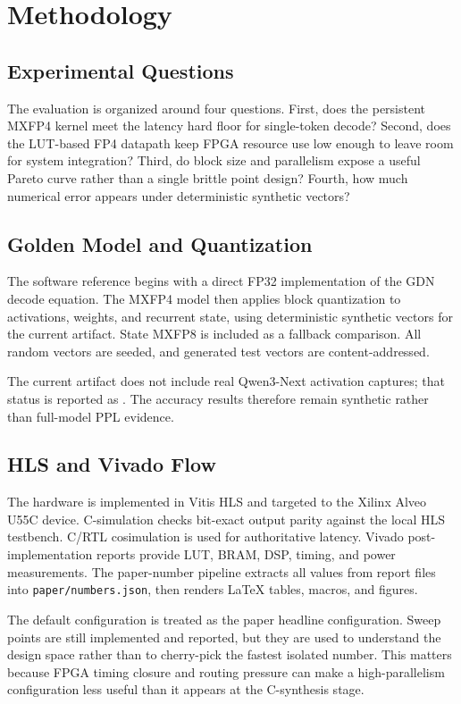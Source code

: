 \documentclass[conference]{IEEEtran}
\begin{document}
\section{Methodology}

\subsection{Experimental Questions}

The evaluation is organized around four questions. First, does the persistent
MXFP4 kernel meet the latency hard floor for single-token decode? Second, does
the LUT-based FP4 datapath keep FPGA resource use low enough to leave room for
system integration? Third, do block size and parallelism expose a useful Pareto
curve rather than a single brittle point design? Fourth, how much numerical error
appears under deterministic synthetic vectors?

\subsection{Golden Model and Quantization}

The software reference begins with a direct FP32 implementation of the GDN decode
equation. The MXFP4 model then applies block quantization to activations,
weights, and recurrent state, using deterministic synthetic vectors for the
current artifact. State MXFP8 is included as a fallback comparison. All random
vectors are seeded, and generated test vectors are content-addressed.

The current artifact does not include real Qwen3-Next activation captures; that
status is reported as \QwenCaptureStatus. The accuracy results therefore remain
synthetic rather than full-model PPL evidence.

\subsection{HLS and Vivado Flow}

The hardware is implemented in Vitis HLS and targeted to the Xilinx Alveo U55C
device. C-simulation checks bit-exact output parity against the local HLS
testbench. C/RTL cosimulation is used for authoritative latency. Vivado
post-implementation reports provide LUT, BRAM, DSP, timing, and power
measurements. The paper-number pipeline extracts all values from report files
into \texttt{paper/numbers.json}, then renders LaTeX tables, macros, and figures.

The default configuration is treated as the paper headline configuration. Sweep
points are still implemented and reported, but they are used to understand the
design space rather than to cherry-pick the fastest isolated number. This matters
because FPGA timing closure and routing pressure can make a high-parallelism
configuration less useful than it appears at the C-synthesis stage.
\end{document}
